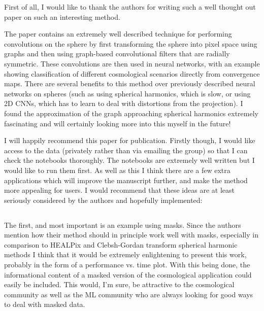 \documentclass[12pt,a4paper]{article}
\newcommand{\nati}[1]{{\color[rgb]{.1,.6,.1}{NP: #1}}}
\newcommand{\todo}[1]{{\color[rgb]{.6,.1,.6}{TODO: #1}}}
\begin{document}
\begin{mdframed}[style=comment] 
First of all, I would like to thank the authors for writing such a well thought out paper on such an interesting method.

The paper contains an extremely well described technique for performing convolutions on the sphere by first transforming the sphere into pixel space using graphs and then using graph-based convolutional filters that are radially symmetric. These convolutions are then used in neural networks, with an example showing classification of different cosmological scenarios directly from convergence maps. There are several benefits to this method over previously described neural networks on spheres (such as using spherical harmonics, which is slow, or using 2D CNNs, which has to learn to deal with distortions from the projection). I found the approximation of the graph approaching spherical harmonics extremely fascinating and will certainly looking more into this myself in the future!

I will happily recommend this paper for publication. Firstly though, I would like access to the data (privately rather than via emailing the group) so that I can check the notebooks thoroughly. The notebooks are extremely well written but I would like to run them first. As well as this I think there are a few extra applications which will improve the manuscript further, and make the method more appealing for users. I would recommend that these ideas are at least seriously considered by the authors and hopefully implemented: 
\end{mdframed}

\todo{Thank the reviewer + give him access to data}

\subsection{}

\begin{mdframed}[style=comment] 
The first, and most important is an example using masks. Since the authors mention how their method should in principle work well with masks, especially in comparison to HEALPix and Clebsh-Gordan transform spherical harmonic methods I think that it would be extremely enlightening to present this work, probably in the form of a performance vs. time plot. With this being done, the informational content of a masked version of the cosmological application could easily be included. This would, I'm sure, be attractive to the cosmological community as well as the ML community who are always looking for good ways to deal with masked data.
\end{mdframed}
\nati{I do not think we can practically compare with Clebsh-Gordan transform. We need to explain that to the reviewer. This is a sensitive point.}
\end{document}
